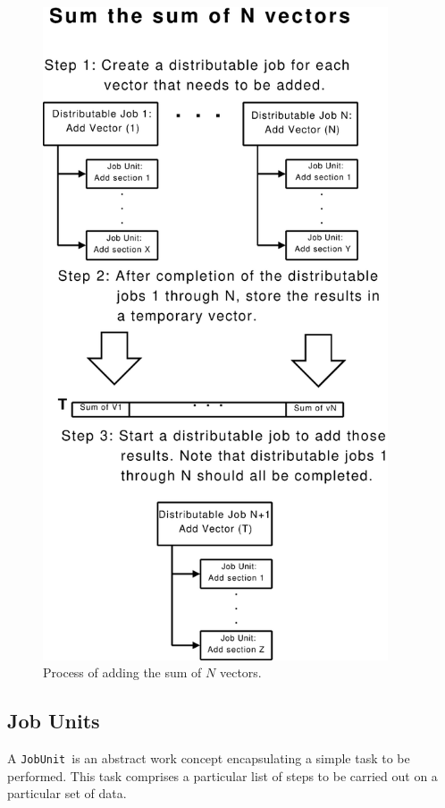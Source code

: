 \documentclass[a4paper,12pt,english]{report}
\newcommand{\JU}{\texttt{JobUnit}}
\begin{document}
\begin{figure}[!ht]
\begin{center}
\includegraphics [width=10.2cm]{images/SumNvectors.eps}
\end{center}
\caption{Process of adding the sum of $N$ vectors.}
\label{sumnvectors}
\end{figure}

\clearpage

\subsection{Job Units}

A \JU \ is an abstract work concept encapsulating a simple task to be performed. This task comprises a particular list of steps to be carried out on a particular set of data.
\end{document}
